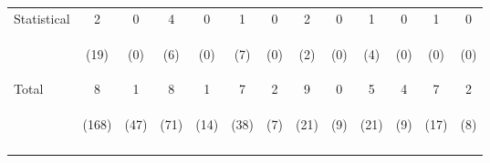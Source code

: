 \begin{tabular}{lcccccccccccc}
\noalign{\smallskip}Statistical & 2 & 0 & 4 & 0 & 1 & 0 & 2 & 0 & 1 & 0 & 1 & 0\\
 & \begin{footnotesize}(19)\end{footnotesize} & \begin{footnotesize}(0)\end{footnotesize} & \begin{footnotesize}(6)\end{footnotesize} & \begin{footnotesize}(0)\end{footnotesize} & \begin{footnotesize}(7)\end{footnotesize} & \begin{footnotesize}(0)\end{footnotesize} & \begin{footnotesize}(2)\end{footnotesize} & \begin{footnotesize}(0)\end{footnotesize} & \begin{footnotesize}(4)\end{footnotesize} & \begin{footnotesize}(0)\end{footnotesize} & \begin{footnotesize}(0)\end{footnotesize} & \begin{footnotesize}(0)\end{footnotesize}\\
\noalign{\smallskip}Total & 8 & 1 & 8 & 1 & 7 & 2 & 9 & 0 & 5 & 4 & 7 & 2\\
 & \begin{footnotesize}(168)\end{footnotesize} & \begin{footnotesize}(47)\end{footnotesize} & \begin{footnotesize}(71)\end{footnotesize} & \begin{footnotesize}(14)\end{footnotesize} & \begin{footnotesize}(38)\end{footnotesize} & \begin{footnotesize}(7)\end{footnotesize} & \begin{footnotesize}(21)\end{footnotesize} & \begin{footnotesize}(9)\end{footnotesize} & \begin{footnotesize}(21)\end{footnotesize} & \begin{footnotesize}(9)\end{footnotesize} & \begin{footnotesize}(17)\end{footnotesize} & \begin{footnotesize}(8)\end{footnotesize}\\
\noalign{\smallskip}\hline\end{tabular}\\
